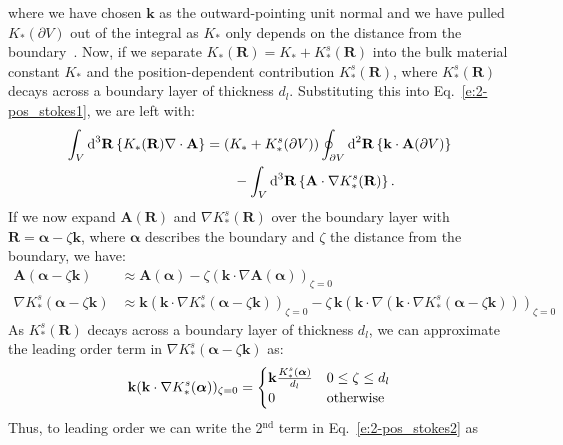 where we have chosen $\mathbf{k}$ as the outward-pointing unit normal and we have pulled $K_*(\partial V)$ out of the integral as $K_*$ only depends on the distance from the boundary~\cite{RN55}.
Now, if we separate $K_*(\mathbf{R}) = K_* + K_*^s(\mathbf{R})$ into the bulk material constant $K_*$ and the position-dependent contribution $K_*^s(\mathbf{R})$, where $K_*^s(\mathbf{R})$ decays across a boundary layer of thickness $d_l$.
Substituting this into Eq.~\ref{e:2-pos_stokes1}, we are left with:
\begin{align}
  \int_{V}\textup{d}^3\mathbf{R} \left \{ K_{*} (\mathbf{R}) \nabla \cdot \mathbf{A} \right \} &=
  (K_*+K_*^s(\partial V)) \oint_{\partial V} \textup{d}^2\mathbf{R} \left \{ \mathbf{k} \cdot \mathbf{A}(\partial V)\right \} \nonumber \\&
  \quad \quad - \int_{V} \textup{d}^3\mathbf{R} \left \{ \mathbf{A} \cdot \nabla K_{*}^s (\mathbf{R}) \right \}. \label{e:2-pos_stokes2}
\end{align}
If we now expand $\mathbf{A}(\mathbf{R})$ and $\nabla K_*^s(\mathbf{R})$ over the boundary layer with $\mathbf{R} = \bm{\alpha} - \zeta \mathbf{k}$, where $\bm{\alpha}$ describes the boundary and $\zeta$ the distance from the boundary, we have:
\begin{align}
  \mathbf{A}(\bm{\alpha} - \zeta \mathbf{k}) &\approx \mathbf{A}(\bm{\alpha}) - \zeta (\mathbf{k} \cdot \nabla \mathbf{A}(\bm{\alpha}))_{\zeta = 0} \label{e:2-expandA} \\
  \nabla K_*^s(\bm{\alpha} - \zeta \mathbf{k}) &\approx \mathbf{k} (\mathbf{k} \cdot \nabla K_*^s(\bm{\alpha} - \zeta \mathbf{k}))_{\zeta = 0} - \zeta\, \mathbf{k}(\mathbf{k} \cdot \nabla (\mathbf{k} \cdot \nabla K_*^s(\bm{\alpha} - \zeta \mathbf{k})))_{\zeta = 0}
\end{align}
As $K_*^s(\mathbf{R})$ decays across a boundary layer of thickness $d_l$, we can approximate the leading order term in $\nabla K_*^s(\bm{\alpha} - \zeta \mathbf{k})$ as:
\begin{equation}
  \mathbf{k} (\mathbf{k} \cdot \nabla K_*^s(\bm{\alpha}))_{\zeta = 0} =
  \begin{cases}
    \mathbf{k}\frac{K_*^s(\bm{\alpha})}{d_l} & 0 \leq \zeta \leq d_l \\
    0 & \textup{otherwise}
  \end{cases}
\end{equation}
Thus, to leading order we can write the 2$^\textrm{nd}$ term in Eq.~\ref{e:2-pos_stokes2} as
